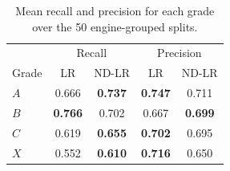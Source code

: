 \begin{table}[t]
\centering
\small
\caption{Mean recall and precision for each grade over the 50 engine-grouped splits.}
\label{tab:class_recall}
\begin{tabular}{lcccc}
\hline
 & \multicolumn{2}{c}{Recall} & \multicolumn{2}{c}{Precision} \\
Grade & LR & ND-LR & LR & ND-LR \\
\hline
$A$ & 0.666 & \textbf{0.737} & \textbf{0.747} & 0.711 \\
$B$ & \textbf{0.766} & 0.702 & 0.667 & \textbf{0.699} \\
$C$ & 0.619 & \textbf{0.655} & \textbf{0.702} & 0.695 \\
$X$ & 0.552 & \textbf{0.610} & \textbf{0.716} & 0.650 \\
\hline
\end{tabular}
\end{table}

